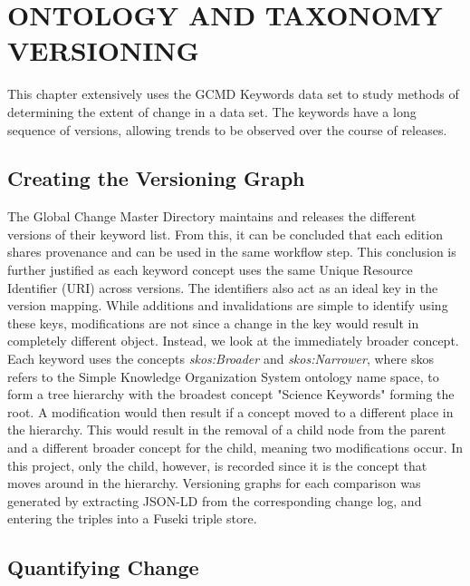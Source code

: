 
\chapter{ONTOLOGY AND TAXONOMY VERSIONING}

This chapter extensively uses the GCMD Keywords data set to study methods of determining the extent of change in a data set.
The keywords have a long sequence of versions, allowing trends to be observed over the course of releases.

\section{Creating the Versioning Graph}

The Global Change Master Directory maintains and releases the different versions of their keyword list.
From this, it can be concluded that each edition shares provenance and can be used in the same workflow step.
This conclusion is further justified as each keyword concept uses the same Unique Resource Identifier (URI) across versions.
The identifiers also act as an ideal key in the version mapping.
While additions and invalidations are simple to identify using these keys, modifications are not since a change in the key would result in completely different object.
Instead, we look at the immediately broader concept.
Each keyword uses the concepts \textit{skos:Broader} and \textit{skos:Narrower}, where skos refers to the Simple Knowledge Organization System ontology name space, to form a tree hierarchy with the broadest concept "Science Keywords" forming the root.
A modification would then result if a concept moved to a different place in the hierarchy.
This would result in the removal of a child node from the parent and a different broader concept for the child, meaning two modifications occur.
In this project, only the child, however, is recorded since it is the concept that moves around in the hierarchy.
Versioning graphs for each comparison was generated by extracting JSON-LD from the corresponding change log, and entering the triples into a Fuseki triple store.

\section{Quantifying Change}

